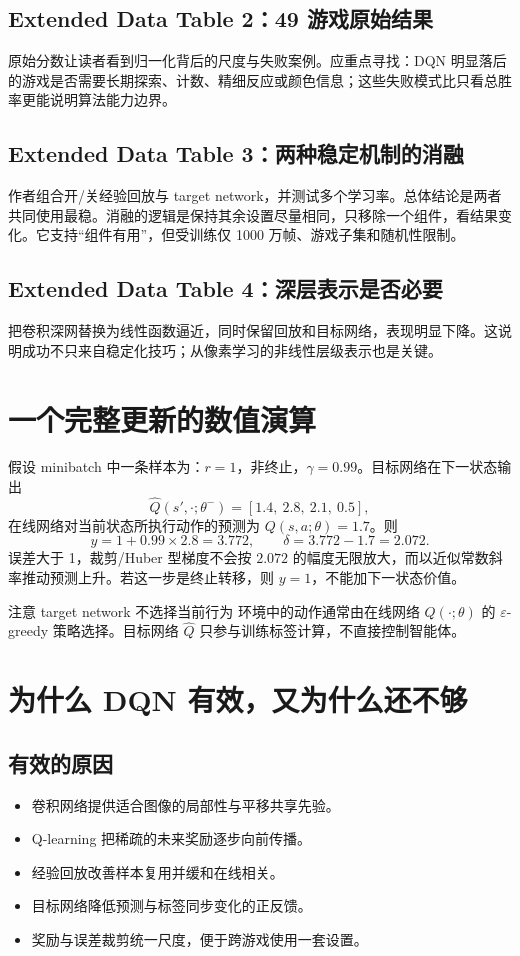 \documentclass[UTF8,11pt]{ctexart}
\begin{document}
\subsection{Extended Data Table 2：49 游戏原始结果}
原始分数让读者看到归一化背后的尺度与失败案例。应重点寻找：DQN 明显落后的游戏是否需要长期探索、计数、精细反应或颜色信息；这些失败模式比只看总胜率更能说明算法能力边界。

\subsection{Extended Data Table 3：两种稳定机制的消融}
作者组合开/关经验回放与 target network，并测试多个学习率。总体结论是两者共同使用最稳。消融的逻辑是保持其余设置尽量相同，只移除一个组件，看结果变化。它支持“组件有用”，但受训练仅 1000 万帧、游戏子集和随机性限制。

\subsection{Extended Data Table 4：深层表示是否必要}
把卷积深网替换为线性函数逼近，同时保留回放和目标网络，表现明显下降。这说明成功不只来自稳定化技巧；从像素学习的非线性层级表示也是关键。

\section{一个完整更新的数值演算}
假设 minibatch 中一条样本为：$r=1$，非终止，$\gamma=0.99$。目标网络在下一状态输出
\[
\widehat Q(s',\cdot;\theta^-)=[1.4,\ 2.8,\ 2.1,\ 0.5],
\]
在线网络对当前状态所执行动作的预测为 $Q(s,a;\theta)=1.7$。则
\[
y=1+0.99\times2.8=3.772,
\qquad \delta=3.772-1.7=2.072.
\]
误差大于 1，裁剪/Huber 型梯度不会按 $2.072$ 的幅度无限放大，而以近似常数斜率推动预测上升。若这一步是终止转移，则 $y=1$，不能加下一状态价值。

\begin{warnbox}{注意 target network 不选择当前行为}
环境中的动作通常由在线网络 $Q(\cdot;\theta)$ 的 $\varepsilon$-greedy 策略选择。目标网络 $\widehat Q$ 只参与训练标签计算，不直接控制智能体。
\end{warnbox}

\section{为什么 DQN 有效，又为什么还不够}
\subsection{有效的原因}
\begin{itemize}
\item 卷积网络提供适合图像的局部性与平移共享先验。
\item Q-learning 把稀疏的未来奖励逐步向前传播。
\item 经验回放改善样本复用并缓和在线相关。
\item 目标网络降低预测与标签同步变化的正反馈。
\item 奖励与误差裁剪统一尺度，便于跨游戏使用一套设置。
\end{itemize}
\end{document}
